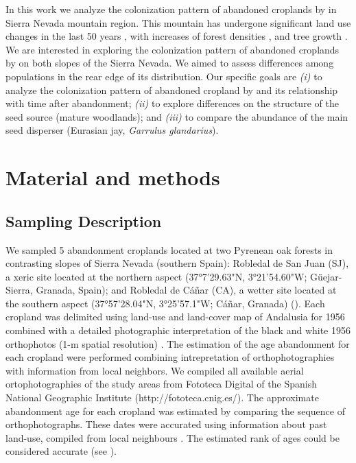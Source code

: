 In this work we analyze the colonization pattern of abandoned croplands by \Qpy in Sierra Nevada mountain region. This mountain has undergone significant land use changes in the last 50 years \autocites{JimenezOlivenciaetal2015EvolucionUsos}, with increases of forest densities \autocite[see chapter \ref{sec:carbon}; also][]{JimenezOlivenciaetal2015MedioSiglo}, and tree growth \autocite[see chapter \ref{sec:dendro};][]{PerezLuqueetal2020LanduseLegacies}. We are interested in exploring the colonization pattern of abandoned croplands by \Qp on both slopes of the Sierra Nevada. We aimed to assess differences among populations in the rear edge of its distribution. Our specific goals are \emph{(i)} to analyze the colonization pattern of abandoned cropland by \Qp and its relationship with time after abandonment; \emph{(ii)} to explore differences on the structure of the seed source (mature woodlands); and \emph{(iii)} to compare the abundance of the main seed disperser (Eurasian jay, \emph{Garrulus glandarius}).

\section{Material and methods}\label{sec:coloniza:MatMet}
\subsection{Sampling Description}\label{sec:coloniza:sampling}
We sampled 5 abandonment croplands located at two Pyrenean oak forests in contrasting slopes of Sierra Nevada (southern Spain): Robledal de San Juan (SJ), a xeric site located at the northern aspect (37°7'29.63"N, 3°21'54.60"W; Güejar-Sierra, Granada, Spain); and Robledal de Cáñar (CA), a wetter site located at the southern aspect (37°57'28.04"N, 3°25'57.1"W; Cáñar, Granada) (). Each cropland was delimited using land-use and land-cover map of Andalusia for 1956 \autocites[][]{CMA2007MapaUsos} combined with a detailed photographic interpretation of the black and white 1956 orthophotos (1-m spatial resolution) \autocites[see][for more details]{NavarroGonzalezetal2012CartografiaHistorica}. The estimation of the age abandonment for each cropland were performed combining intrepretation of orthophotographies with information from local neighbors. We compiled all available aerial ortophotographies of the study areas from Fototeca Digital of the Spanish National Geographic Institute (http://fototeca.cnig.es/). The approximate abandonment age for each cropland was estimated by comparing the sequence of orthophotographs. These dates were accurated using information about past land-use, compiled from local neighbours \autocites[by local workshops and interviews with retired elder: farmers, shepherds and loggers; see details in ][]{MorenoLlorcaetal2014CaracterizacionFuentes,MorenoLlorcaetal2016HistoricalAnalysis}. The estimated rank of ages could be considered accurate (see ).

